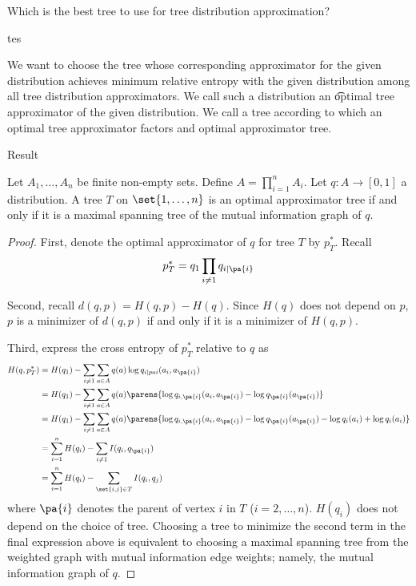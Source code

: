 

Which is the best tree to use for tree distribution approximation?

tes

We want to choose the tree whose corresponding approximator for the given distribution achieves minimum relative entropy with the given distribution among all tree distribution approximators.
We call such a distribution an \t{optimal tree approximator} of the given distribution.
We call a tree according to which an optimal tree approximator factors and optimal approximator tree.

{Result}

\begin{prop}

Let $A_1, \dots, A_n$ be finite non-empty sets.
Define $A = \prod_{i = 1}^{n} A_i$.
Let $q: A \to [0, 1]$ a distribution.
A tree $T$ on $\set{1, \dots, n}$ is an optimal approximator tree if and only if it is a maximal spanning tree of the mutual information graph of $q$.

\begin{proof}
First, denote the optimal approximator of $q$ for tree $T$ by $p^*_T$. Recall
$$
  p^*_T = q_1 \prod_{i \neq 1} q_{i \mid \pa{i}}
$$

Second, recall $d(q, p) = H(q, p) - H(q)$.
Since $H(q)$ does not depend on $p$, $p$ is a minimizer of $d(q, p)$ if and only if it is a minimizer of $H(q, p)$.

Third, express the cross entropy of $p^*_T$ relative to $q$ as
$$
\begin{aligned}
  H(q, p^*_T) &= H(q_1) - \sum_{i \neq 1} \sum_{a \in A} q(a)\log q_{i \mid pa{i}}(a_i, a_{\pa{i}}) \\
              &= H(q_1) - \sum_{i \neq 1} \sum_{a \in A} q(a)\parens{\log q_{i,\pa{i}}(a_i, a_{\pa{i}}) - \log q_{\pa{i}}(a_{\pa{i}})} \\
              &= H(q_1) - \sum_{i \neq 1} \sum_{a \in A} q(a)\parens{\log q_{i,\pa{i}}(a_i, a_{\pa{i}}) - \log q_{\pa{i}}(a_{\pa{i}}) - \log q_i(a_i)  + \log q_{i}(a_i)} \\
              &= \sum_{i = 1}^{n} H(q_i) - \sum_{i \neq 1} I(q_i, q_{\pa{i}}) \\
              &= \sum_{i = 1}^{n} H(q_i) - \sum_{\set{i,j} \in T} I(q_i, q_{j}) \\
\end{aligned}
$$
where $\pa{i}$ denotes the parent of vertex $i$ in $T$ ($i = 2, \dots, n$).
$H(q_i)$ does not depend on the choice of tree.
Choosing a tree to minimize the second term in the final expression above is equivalent to choosing a maximal spanning tree from the weighted graph with mutual information edge weights; namely, the mutual information graph of $q$.

\end{proof}

\end{prop}
